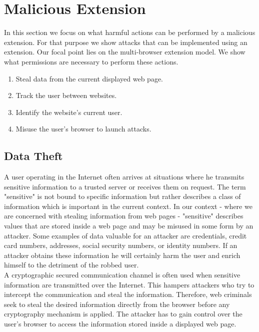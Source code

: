 \documentclass[article,colorback,accentcolor=tud9c,type=bsc]{tudthesis}
\let\stdsection\section
\let\stdsubsection\subsection
\renewcommand\section{\newpage\stdsection}
\renewcommand\subsection{\newpage\stdsubsection}
\begin{document}
\section{Malicious Extension}
	
	In this section we focus on what harmful actions can be performed by a malicious extension. For that purpose we show attacks that can be implemented using an extension. Our focal point lies on the multi-browser extension model. We show what permissions are necessary to perform these actions. \\ 
	
	\begin{enumerate}
		\item Steal data from the current displayed web page.
		\item Track the user between websites.
		\item Identify the website's current user. 
		\item Misuse the user's browser to launch attacks.
	\end{enumerate} 
	
\subsection{Data Theft}	
	
	A user operating in the Internet often arrives at situations where he transmits sensitive information to a trusted server or receives them on request. The term "sensitive" is not bound to specific information but rather describes a class of information which is important in the current context. In our context - where we are concerned with stealing information from web pages - "sensitive" describes values that are stored inside a web page and may be misused in some form by an attacker. Some examples of data valuable for an attacker are credentials, credit card numbers, addresses, social security numbers, or identity numbers. If an attacker obtains these information he will certainly harm the user and enrich himself to the detriment of the robbed user. \\
	
	A cryptographic secured communication channel is often used when sensitive information are transmitted over the Internet. This hampers attackers who try to intercept the communication and steal the information. Therefore, web criminals seek to steal the desired information directly from the browser before any cryptography mechanism is applied. The attacker has to gain control over the user's browser to access the information stored inside a displayed web page. \\
	
\end{document}
